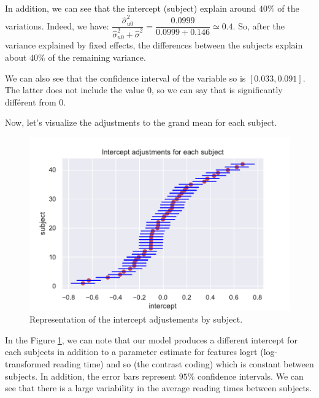 \documentclass{article}
\begin{document}
In addition, we can see that the intercept (subject) explain around $40\%$ of the variations. Indeed, we have: $\dfrac{\hat{\sigma}_{u0}^2}{\hat{\sigma}_{u0}^2+\hat{\sigma}^2}=\dfrac{0.0999}{0.0999+0.146} \simeq 0.4$.
So, after the variance explained by fixed effects, the differences between the subjects explain about $40\%$ of the remaining variance.

We can also see that the confidence interval of the variable so is $[0.033, 0.091]$. The latter does not include the value $0$, so we can say that is significantly différent from $0$.

Now, let's visualize the adjustments to the grand mean for each subject.

\begin{figure}[H]
    \centering
    \includegraphics[scale=.65]{./images/model1_inter.pdf}
    \caption{Representation of the intercept adjustements by subject.}
    \label{fig:model1}
\end{figure}

In the Figure \ref{fig:model1}, we can note that our model produces a different intercept for each subjects in addition to a parameter estimate for features logrt (log-transformed reading time) and so (the contrast coding) which is constant between subjects. In addition, the error bars represent $95\%$ confidence intervals. We can see that there is a large variability in the average reading times between subjects.
\end{document}
